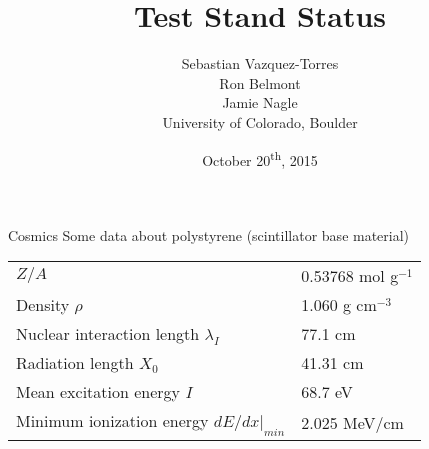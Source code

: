 \documentclass[compress,8pt]{beamer} %
\title[sPHENIX HCal meeting, Oct 20, 2015 - Slide \insertframenumber]{Test Stand Status}
\author[CU-Boulder]{Sebastian Vazquez-Torres \\  Ron Belmont \\ Jamie Nagle \\ \vspace{20pt} University of Colorado, Boulder}
\date{October 20\textsuperscript{th}, 2015}
\begin{document}
\begin{frame}
\titlepage
\end{frame}






\begin{frame}{Cosmics}
Some data about polystyrene (scintillator base material) \\
\begin{tabular}{ll}
\hline
$Z/A$                                                 & 0.53768 mol g$^{-1}$ \\
Density $\rho$                                        & 1.060 g cm$^{-3}$    \\
Nuclear interaction length $\lambda_I$                & 77.1 cm              \\
Radiation length $X_0$                                & 41.31 cm             \\
Mean excitation energy $I$                            & 68.7 eV              \\
Minimum ionization energy $dE/dx|_{min}$              & 2.025 MeV/cm         \\
\hline
\end{tabular}
\end{frame}
\end{document}
